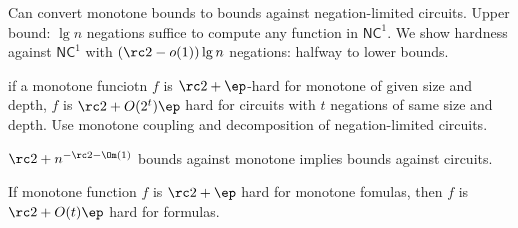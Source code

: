 Can convert monotone bounds to bounds against negation-limited circuits. Upper bound: $\lg n$ negations suffice to compute any function in $\mathsf{NC}^1$. We show hardness against $\mathsf{NC}^1$ with $(\rc2-o(1))\lg n$ negations: halfway to lower bounds.

if a monotone funciotn $f$ is $\rc2+\ep$-hard for monotone of given size and depth, $f$ is $\rc2+O(2^t)\ep$ hard for circuits with $t$ negations of same size and depth. Use monotone coupling and decomposition of negation-limited circuits.

$\rc2+n^{-\rc2-\Om(1)}$ bounds against monotone implies bounds against circuits.

If monotone function $f$ is $\rc2+\ep$ hard for monotone fomulas, then $f$ is $\rc2+O(t)\ep$ hard for formulas.

